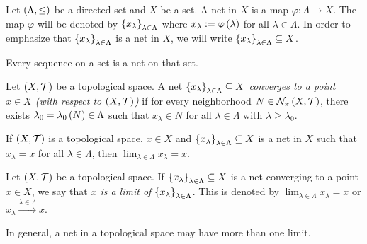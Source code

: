 \begin{definition}
  Let $\left(\Lambda,\leq\right)$ be a directed set and $X$ be a set. A net in $X$ is a map $\varphi:\Lambda\rightarrow X$. The map $\varphi$ will be denoted by $\left\{x_{\lambda}\right\}_{\lambda\in\Lambda}$ where $x_{\lambda}:=\varphi\left(\lambda\right)$ for all $\lambda\in\Lambda$. In order to emphasize that $\left\{x_{\lambda}\right\}_{\lambda\in\Lambda}$ is a net in $X$, we will write $\left\{x_{\lambda}\right\}_{\lambda\in\Lambda}\subseteq X$.
\end{definition}

\begin{remark}
  Every sequence on a set is a net on that set.
\end{remark}

\begin{definition}
  Let $\left(X,\mathcal{T}\right)$ be a topological space. A net \emph{$\left\{x_\lambda\right\}_{\lambda\in\Lambda}\subseteq X$ converges to a point $x\in X$ (with respect to $\left(X,\mathcal{T}\right)$)} if for every neighborhood $N\in\mathcal{N}_x\left(X,\mathcal{T}\right)$, there exists $\lambda_0=\lambda_0\left(N\right)\in\Lambda$ such that $x_\lambda\in N$ for all $\lambda\in\Lambda$ with $\lambda\geq\lambda_0$. 
\end{definition}

\begin{remark}
  If $\left(X,\mathcal{T}\right)$ is a topological space, $x\in X$ and $\left\{x_\lambda\right\}_{\lambda\in\Lambda}\subseteq X$ is a net in $X$ such that $x_\lambda=x$ for all $\lambda\in\Lambda$, then $\lim_{\lambda\in\Lambda}{x_\lambda}=x$.
\end{remark}

\begin{remark}
  Let $\left(X,\mathcal{T}\right)$ be a topological space. If \emph{$\left\{x_\lambda\right\}_{\lambda\in\Lambda}\subseteq X$} is a net converging to a point $x\in X$, we say that \textit{$x$ is a limit of $\left\{x_\lambda\right\}_{\lambda\in\Lambda}$}. This is denoted by $\lim_{\lambda\in\Lambda}{x_\lambda}=x$ or $x_\lambda\stackrel{\lambda\in\Lambda}{\rightarrow}x$. 
  
  In general, a net in a topological space may have more than one limit.
\end{remark}

